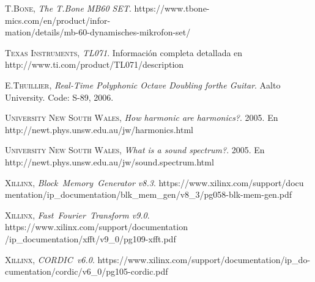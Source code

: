 \documentclass[a4paper, 11pt, oneside, openright]{report}
\begin{document}
\begin{thebibliography}{aa}
	\textsc{T.Bone},
	\textit{The T.Bone MB60 SET}. https://www.tbone-mics.com/en/product/infor-\\mation/details/mb-60-dynamisches-mikrofon-set/
	
	\textsc{Texas Instruments},
	\textit{TL071}. Información completa detallada en http://www.ti.com/product/TL071/description
	
	\textsc{E.Thuillier},
	\textit{Real-Time Polyphonic Octave Doubling forthe Guitar}. Aalto University. Code: S-89, 2006.
	
	\textsc{University New South Wales},
	\textit{How harmonic are harmonics?}. 2005. En
	http://newt.phys.unsw.edu.au/jw/harmonics.html
	
	\textsc{University New South Wales},
	\textit{What is a sound spectrum?}. 2005. En
	http://newt.phys.unsw.edu.au/jw/sound.spectrum.html
	
	\textsc{Xillinx},
	\textit{Block~Memory~Generator v8.3}. https://www.xilinx.com/support/docu mentation/ip\_documentation/blk\_mem\_gen/v8\_3/pg058-blk-mem-gen.pdf
	
	\textsc{Xillinx},
	\textit{Fast~Fourier~Transform v9.0}. https://www.xilinx.com/support/documentation\\/ip\_documentation/xfft/v9\_0/pg109-xfft.pdf
	
	\textsc{Xillinx},
	\textit{CORDIC~v6.0}. https://www.xilinx.com/support/documentation/ip\_do-\\cumentation/cordic/v6\_0/pg105-cordic.pdf
	
\end{thebibliography}
\end{document}

